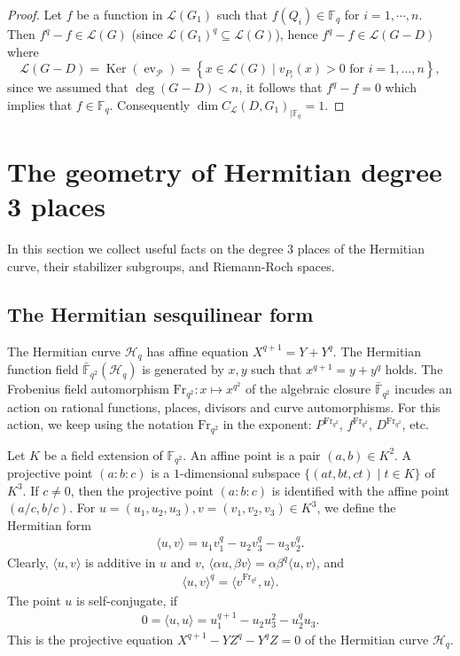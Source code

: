 \documentclass[a4paper]{amsart}
\theoremstyle{plain}
\theoremstyle{definition}
\theoremstyle{remark}
\newcommand{\Frob}{{\mathrm{Fr}_{q^2}}}
\newcommand{\calP}{\mathcal{P}}
\begin{document}
\begin{proof}
	Let $f$ be a function in $\mathscr{L}(G_1)$ such that $f(Q_i) \in \mathbb{F}_q$ for $i=1,\cdots,n$. Then $f^q -f \in \mathscr{L}(G)$ (since $\mathscr{L}(G_1)^q \subseteq \mathscr{L}(G)$), hence $f^q - f \in  \mathscr{L}(G-D)$ where
	\[\mathscr{L}(G-D) = \operatorname{Ker}\left(\operatorname{ev}_{\calP}\right)=\left\{x \in \mathscr{L}(G) \mid v_{P_i}(x)>0 \text { for } i=1, \ldots, n\right\} ,\]
	since we assumed that $\deg (G-D)<n$, it follows that $f^q -f =0$ which implies that $f \in \mathbb{F}_q$. Consequently $\dim C_{\mathcal{L}}(D,G_1)_{\mid \mathbb{F}_q}= 1$.
\end{proof}






\section{The geometry of Hermitian degree 3 places} \label{sec:geometry}

In this section we collect useful facts on the degree 3 places of the Hermitian curve, their stabilizer subgroups, and Riemann-Roch spaces. 

\subsection{The Hermitian sesquilinear form} \label{ssec:h-form}
The Hermitian curve $\mathscr{H}_q$ has affine equation $X^{q+1}=Y+Y^q$. The Hermitian function field $\bar{\mathbb{F}}_{q^2}(\mathscr{H}_q)$ is generated by $x,y$ such that $x^{q+1}=y+y^q$ holds. The Frobenius field automorphism $\Frob:x\mapsto x^{q^2}$ of the algebraic closure $\bar{\mathbb{F}}_{q^2}$ incudes an action on rational functions, places, divisors and curve automorphisms. For this action, we keep using the notation $\Frob$ in the exponent: $P^\Frob$, $f^\Frob$, $D^\Frob$, etc. 

Let $K$ be a field extension of $\mathbb{F}_{q^2}$. An affine point is a pair $(a,b)\in K^2$. A projective point $(a:b:c)$ is a $1$-dimensional subspace $\{(at,bt,ct) \mid t\in K\}$ of $K^3$. If $c\neq 0$, then the projective point $(a:b:c)$ is identified with the affine point $(a/c,b/c)$. For $u=(u_1,u_2,u_3), v=(v_1,v_2,v_3) \in K^3$, we define the Hermitian form 
\begin{align*} %
\langle u,v \rangle = u_1v_1^q-u_2v_3^q-u_3v_2^q.
\end{align*}
Clearly, $\langle u,v \rangle$ is additive in $u$ and $v$, $\langle \alpha u, \beta v\rangle =\alpha \beta^q \langle u,v \rangle$, and 
\begin{align*} %
\langle u,v \rangle^q=\langle v^\Frob,u \rangle.
\end{align*}
The point $u$ is self-conjugate, if 
\begin{align*} %
0=\langle u,u \rangle = u_1^{q+1}-u_2u_3^2-u_2^qu_3.
\end{align*}
This is the projective equation $X^{q+1}-YZ^q-Y^qZ=0$ of the Hermitian curve $\mathscr{H}_q$. 
\end{document}
